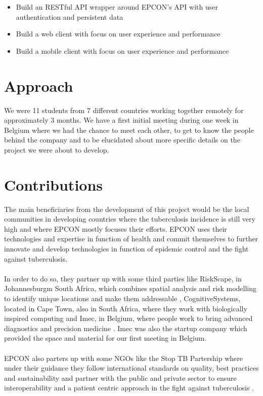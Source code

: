 \begin{itemize}

\item
Build an RESTful API wrapper around EPCON's API with user authentication and persistent data
\item 
Build a web client with focus on user experience and performance
\item 
Build a mobile client with focus on user experience and performance

\end{itemize}

\section{Approach}

We were 11 students from 7 different countries working together remotely for approximately 3 months. We have a first initial meeting during one week in Belgium where we had the chance to meet each other, to get to know the people behind the company and to be elucidated about more specific details on the project we were about to develop.


\section{Contributions}

The main beneficiaries from the development of this project would be the local communities in developing countries where the tuberculosis incidence is still very high and where EPCON mostly focuses their efforts. EPCON uses their technologies and expertise in function of health and commit themselves to further innovate and develop technologies in function of epidemic control and the fight against tuberculosis.
\\ \\
In order to do so, they partner up with some third parties like RiskScape, in Johannesburgm South Africa, which combines spatial analysis and risk modelling to identify unique locations and make them addressable \cite{RiskScape}, CognitiveSystems, located in Cape Town, also in South Africa, where they work with biologically inspired computing \cite{CognitiveSystems} and Imec, in Belgium, where people work to bring advanced diagnostics and precision medicine \cite{Imec}. Imec was also the startup company which provided the space and material for our first meeting in Belgium.
\\ \\
EPCON also parters up with some NGOs like the Stop TB Partership where under their guidance they follow international standards on quality, best practices and sustainability and partner with the public and private sector to ensure interoperability and a patient centric approach in the fight against tuberculosis \cite{StopTBPartnership}.

